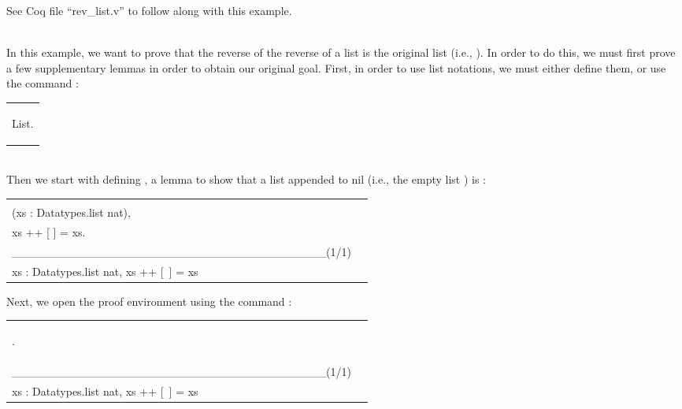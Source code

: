
See Coq file ``rev\_list.v'' to follow along with this example. 


~\\
In this example, we want to prove that the reverse of the reverse of a list is the original list 
(i.e., ). 
In order to do this, we must first prove a few supplementary lemmas in order to obtain 
our original goal. 
First, in order to use list notations, we must either define them, or use the command 
:

\hspace{-1cm}
\begin{tabular}{l}\begin{code}		\Load List.			\end{code}\end{tabular}

~\\
Then we start with defining , a lemma to show that a list  appended to 
nil (i.e., the empty list \TT{[ ]}) is : 

\hspace{-1cm}
\begin{tabular}{p{8cm} p{8cm}}
\begin{code}
\Lemma \nm{list\_nil} : 			\\
\Forall (xs : Datatypes.list nat),		\\
xs ++ [ ] = xs.	
\end{code}
&
\begin{goal}
1 subgoal	\\
\_\_\_\_\_\_\_\_\_\_\_\_\_\_\_\_\_\_\_\_\_\_\_\_\_\_\_\_\_\_\_\_\_\_\_\_\_\_(1/1)	\\
\Forall xs : Datatypes.list nat, 		
xs ++ [\ ] = xs
\end{goal}
\end{tabular}

\noindent
Next, we open the proof environment using the command : 

\hspace{-1cm}
\begin{tabular}{p{8cm} p{8cm}}
\begin{code}
\Proof.
\end{code}
&
\begin{goal}
1 subgoal	\\
\_\_\_\_\_\_\_\_\_\_\_\_\_\_\_\_\_\_\_\_\_\_\_\_\_\_\_\_\_\_\_\_\_\_\_\_\_\_(1/1)	\\
\Forall xs : Datatypes.list nat, 		
xs ++ [\ ] = xs
\end{goal}
\end{tabular}



